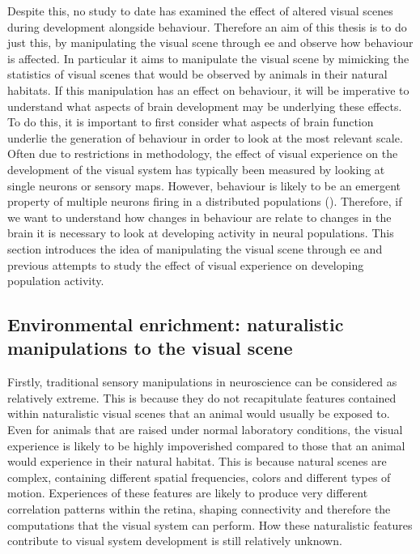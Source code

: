 Despite this, no study to date has examined the effect of altered visual scenes during development alongside behaviour. Therefore an aim of this thesis is to do just this, by manipulating the visual scene through \gls{ee} and observe how behaviour is affected. In particular it aims to manipulate the visual scene by mimicking the statistics of visual scenes that would be observed by animals in their natural habitats. If this manipulation has an effect on behaviour, it will be imperative to understand what aspects of brain development may be underlying these effects. To do this, it is important to first consider what aspects of brain function underlie the generation of behaviour in order to look at the most relevant scale. Often due to restrictions in methodology, the effect of visual experience on the development of the visual system has typically been measured by looking at single neurons or sensory maps. However, behaviour is likely to be an emergent property of multiple neurons firing in a distributed populations (\cite{Yuste2005, Saxena2019TowardsDoctrine, Eichenbaum2017}). Therefore, if we want to understand how changes in behaviour are relate to changes in the brain it is necessary to look at developing activity in neural populations. This section introduces the idea of manipulating the visual scene through \gls{ee} and previous attempts to study the effect of visual experience on developing population activity.

\subsection{Environmental enrichment: naturalistic manipulations to the visual scene}

Firstly, traditional sensory manipulations in neuroscience can be considered as relatively extreme. This is because they do not recapitulate features contained within naturalistic visual scenes that an animal would usually be exposed to. Even for animals that are raised under normal laboratory conditions, the visual experience is likely to be highly impoverished compared to those that an animal would experience in their natural habitat. This is because natural scenes are complex, containing different spatial frequencies, colors and different types of motion. Experiences of these features are likely to produce very different correlation patterns within the retina, shaping connectivity and therefore the computations that the visual system can perform. How these naturalistic features contribute to visual system development is still relatively unknown.

